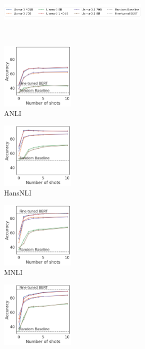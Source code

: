 \begin{figure}[t]
    \begin{subfigure}[b]{\textwidth}
        \centering
        \includegraphics[width=0.8\textwidth]{figures/legend}
        \vspace{-2mm}
    \end{subfigure}\\
    \begin{subfigure}[b]{0.217\textwidth}
    \centering
    \includegraphics[height=3.2cm]{figures/anli}
    \caption{ANLI}
    \end{subfigure}
    \label{fig:anli}
    \begin{subfigure}[b]{0.19\textwidth}
    \centering
    \includegraphics[height=3.2cm, trim=25mm 0 0 0, clip]{figures/hansnli}
    \caption{HansNLI}
    \label{fig:hansnli}
    \end{subfigure}
    \begin{subfigure}[b]{0.19\textwidth}
    \centering
    \includegraphics[height=3.2cm, trim=25mm 0 0 0, clip]{figures/mnli_matched}
    \caption{MNLI}
    \label{fig:mnli}
    \end{subfigure}
    \begin{subfigure}[b]{0.19\textwidth}
    \centering
    \includegraphics[height=3.2cm, trim=25mm 0 0 0, clip]{figures/snli}

\end{subfigure}
\end{figure}
